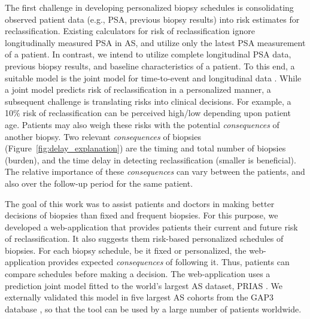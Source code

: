 The first challenge in developing personalized biopsy schedules is consolidating observed patient data (e.g., PSA, previous biopsy results) into risk estimates for reclassification. Existing calculators for risk of reclassification \citep{partin1993use,makarov2007updated} ignore longitudinally measured PSA in AS, and utilize only the latest PSA measurement of a patient. In contrast, we intend to utilize complete longitudinal PSA data, previous biopsy results, and baseline characteristics of a patient. To this end, a suitable model is the joint model for time-to-event and longitudinal data \citep{tomer2019, coley2017prediction,rizopoulos2012joint}. While a joint model predicts risk of reclassification in a personalized manner, a subsequent challenge is translating risks into clinical decisions. For example, a 10\% risk of reclassification can be perceived high/low depending upon patient age. Patients may also weigh these risks with the potential \textit{consequences} of another biopsy. Two relevant \textit{consequences} of biopsies (Figure~\ref{fig:delay_explanation}) are the timing and total number of biopsies (burden), and the time delay in detecting reclassification (smaller is beneficial). The relative importance of these \textit{consequences} can vary between the patients, and also over the follow-up period for the same patient.

The goal of this work was to assist patients and doctors in making better decisions of biopsies than fixed and frequent biopsies. For this purpose, we developed a web-application that provides patients their current and future risk of reclassification. It also suggests them risk-based personalized schedules of biopsies. For each biopsy schedule, be it fixed or personalized, the web-application provides expected \textit{consequences} of following it. Thus, patients can compare schedules before making a decision. The web-application uses a prediction joint model fitted to the world's largest AS dataset, PRIAS \citep{bul2013active}. We externally validated this model in five largest AS cohorts from the GAP3 database \citep{gap3_2018}, so that the tool can be used by a large number of patients worldwide.